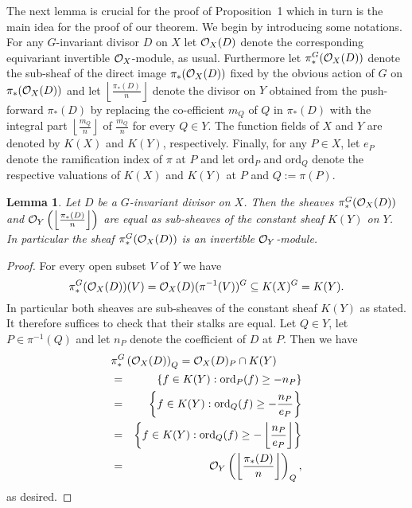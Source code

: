 \documentclass[11pt]{article} %
\newtheorem{lem}{Lemma}
\newcommand{\cO}{{\cal O}}
\begin{document}
The next lemma is crucial for the proof of Proposition~1 which in turn is the main idea for the proof of our theorem. 
We begin by introducing some notations. 
For any $G$-invariant divisor $D$ on $X$ let $\cO_X(D)$ denote the corresponding equivariant invertible $\cO_X$-module, as usual. 
Furthermore let $\pi_*^G(\cO_X(D))$ denote the sub-sheaf of the direct image $\pi_*(\cO_X(D))$ fixed by the obvious action of $G$ on $\pi_*(\cO_X(D))$ and let $\left\lfloor \frac{\pi_*(D)}{n}
\right \rfloor$ denote the divisor on $Y$ obtained from the push-forward $\pi_*(D)$ by replacing the co-efficient $m_Q$ of $Q$ in $\pi_*(D)$ with the integral part $\left \lfloor \frac{m_Q}{n} \right \rfloor$ of $\frac{m_Q}{n}$ for every $Q \in Y$. 
The function fields of $X$ and $Y$ are denoted by $K(X)$ and $K(Y)$, respectively. 
Finally, for any $P \in X$, let $e_P$ denote the ramification index of $\pi$ at $P$ and let $\textrm{ord}_P$ and $\textrm{ord}_Q$ denote the respective valuations of $K(X)$ and $K(Y)$ at $P$ and $Q:=\pi(P)$. \\

  \begin{lem}
    Let $D$ be a $G$-invariant divisor on $X$.
    Then the sheaves $\pi_*^G(\cO_X(D))$ and $\cO_Y\left(\left\lfloor \frac{\pi_*(D)}{n}\right \rfloor\right)$ are equal as sub-sheaves of the constant sheaf $K(Y)$ on $Y$. 
    In particular the sheaf $\pi_*^G(\cO_X(D))$ is an invertible $\cO_Y$-module.
  \end{lem}
  \begin{proof}
    For every open subset $V$ of $Y$ we have 
      \[
	 \pi_*^G(\cO_X(D))(V) = \cO_X(D) (\pi^{-1}(V))^G \subseteq K(X)^G = K(Y).
      \]
    In particular both sheaves are sub-sheaves of the constant sheaf $K(Y)$ as stated. 
    It therefore suffices to check that their stalks are equal. 
    Let $Q \in Y$, let $P \in \pi^{-1}(Q)$ and let $n_P$ denote the coefficient of $D$ at $P$. 
    Then we have
      \begin{eqnarray*}
	 \lefteqn{\pi_*^G\left(\cO_X(D)\right)_Q = \cO_X(D)_P \cap K(Y)}\\
	  &=& \left\{f \in K(Y): \textrm{ord}_P(f) \ge -n_P\right\}\\
	  &=& \left\{f \in K(Y): \textrm{ord}_Q(f) \ge - \frac{n_P}{e_P}\right\}\\
	  &=& \left\{ f \in K(Y): \textrm{ord}_Q(f) \ge - \left\lfloor\frac{n_P}{e_P} \right\rfloor \right\}\\
	  &=& \cO_Y\left(\left\lfloor \frac{\pi_*(D)}{n} \right\rfloor\right)_Q,
      \end{eqnarray*}
    as desired.
  \end{proof}
\end{document}

